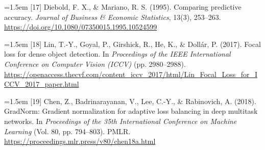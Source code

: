 \documentclass[review,3p,times]{elsarticle}
\begin{document}
\hangindent=1.5em [17] Diebold, F. X., \& Mariano, R. S. (1995). Comparing predictive accuracy. \emph{Journal of Business \& Economic Statistics}, 13(3), 253--263. \url{https://doi.org/10.1080/07350015.1995.10524599}\par\medskip
\hangindent=1.5em [18] Lin, T.-Y., Goyal, P., Girshick, R., He, K., \& Dollár, P. (2017). Focal loss for dense object detection. In \emph{Proceedings of the IEEE International Conference on Computer Vision (ICCV)} (pp. 2980--2988). \url{https://openaccess.thecvf.com/content_iccv_2017/html/Lin_Focal_Loss_for_ICCV_2017_paper.html}\par\medskip
\hangindent=1.5em [19] Chen, Z., Badrinarayanan, V., Lee, C.-Y., \& Rabinovich, A. (2018). GradNorm: Gradient normalization for adaptive loss balancing in deep multitask networks. In \emph{Proceedings of the 35th International Conference on Machine Learning} (Vol. 80, pp. 794--803). PMLR. \url{https://proceedings.mlr.press/v80/chen18a.html}\par\medskip
\endgroup
\end{document}
